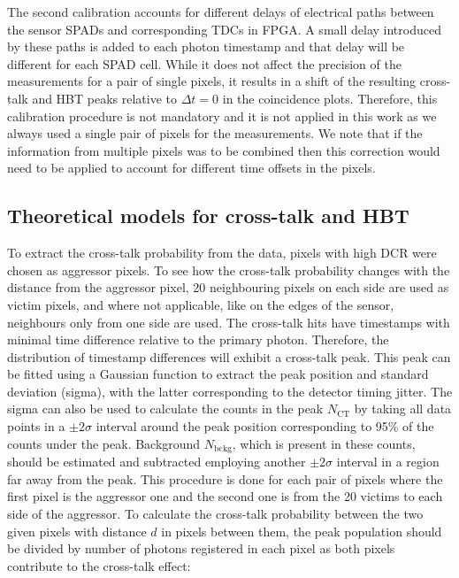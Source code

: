 \documentclass[a4paper,11pt]{article}
\begin{document}
The second calibration accounts for different delays of electrical paths between the sensor SPADs and corresponding TDCs in FPGA. A small delay introduced by these paths is added to each photon timestamp and that delay will be different for each SPAD cell. While it does not affect the precision of the measurements for a pair of single pixels, it results in a shift of the resulting cross-talk and HBT peaks relative to $\Delta t =0$ in the coincidence plots. Therefore, this calibration procedure is not mandatory and it is not applied in this work as we always used a single pair of pixels for the measurements. We note that if the information from multiple pixels was to be combined then this correction would need to be applied to account for different time offsets in the pixels.

\subsection{Theoretical models for cross-talk and HBT}

To extract the cross-talk probability from the data, pixels with high DCR were chosen as aggressor pixels. To see how the cross-talk probability changes with the distance from the aggressor pixel, 20 neighbouring pixels on each side are used as victim pixels, and where not applicable, like on the edges of the sensor, neighbours only from one side are used. The cross-talk hits have timestamps with minimal time difference relative to the primary photon. Therefore, the distribution of timestamp differences will exhibit a cross-talk peak. This peak can be fitted using a Gaussian function to extract the peak position and standard deviation (sigma), with the latter corresponding to the detector timing jitter. The sigma can also be used to calculate the counts in the peak $N_{\mathrm{CT}}$ by taking all data points in a $\pm2\sigma$ interval around the peak position corresponding to 95\% of the counts under the peak. Background $N_{\mathrm{bckg}}$, which is present in these counts, should be estimated and subtracted employing another $\pm2\sigma$ interval in a region far away from the peak. This procedure is done for each pair of pixels where the first pixel is the aggressor one and the second one is from the 20 victims to each side of the aggressor. To calculate the cross-talk probability between the two given pixels with distance $d$ in pixels between them, the peak population should be divided by number of photons registered in each pixel as both pixels contribute to the cross-talk effect:
\end{document}

